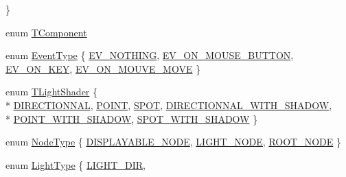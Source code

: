 \begin{DoxyCompactItemize}
 \}
\item 
enum \hyperlink{namespace_agmd_abb9d87ef3f6a4bcb6cc5f2d60ce0bfb3}{T\+Component} 
\item 
enum \hyperlink{namespace_agmd_a1ce5270aaf105962b98398a262590f05}{Event\+Type} \{ \hyperlink{namespace_agmd_a1ce5270aaf105962b98398a262590f05a08636d27d43207cfdbaf9246b26f7c4a}{E\+V\+\_\+\+N\+O\+T\+H\+I\+N\+G}, 
\hyperlink{namespace_agmd_a1ce5270aaf105962b98398a262590f05a6adad47adaf038ae4ff1a31450897cef}{E\+V\+\_\+\+O\+N\+\_\+\+M\+O\+U\+S\+E\+\_\+\+B\+U\+T\+T\+O\+N}, 
\hyperlink{namespace_agmd_a1ce5270aaf105962b98398a262590f05af1c0f29e8647760d770aa1fe8d401140}{E\+V\+\_\+\+O\+N\+\_\+\+K\+E\+Y}, 
\hyperlink{namespace_agmd_a1ce5270aaf105962b98398a262590f05a91c05b6134986db9a10d12e9b065384a}{E\+V\+\_\+\+O\+N\+\_\+\+M\+O\+U\+V\+E\+\_\+\+M\+O\+V\+E}
 \}
\item 
enum \hyperlink{namespace_agmd_aee8ff6eab40434e80559b7a9eeba8dd4}{T\+Light\+Shader} \{ \\*
\hyperlink{namespace_agmd_aee8ff6eab40434e80559b7a9eeba8dd4a15d82839d8fbb16c3a651b9aebee3687}{D\+I\+R\+E\+C\+T\+I\+O\+N\+N\+A\+L}, 
\hyperlink{namespace_agmd_aee8ff6eab40434e80559b7a9eeba8dd4aaf5240300845b9a636c5c59c5cb11133}{P\+O\+I\+N\+T}, 
\hyperlink{namespace_agmd_aee8ff6eab40434e80559b7a9eeba8dd4adc0174908c6b660c935d590f8880d435}{S\+P\+O\+T}, 
\hyperlink{namespace_agmd_aee8ff6eab40434e80559b7a9eeba8dd4af5d83ac033904e96cc0b6dbb0b700e70}{D\+I\+R\+E\+C\+T\+I\+O\+N\+N\+A\+L\+\_\+\+W\+I\+T\+H\+\_\+\+S\+H\+A\+D\+O\+W}, 
\\*
\hyperlink{namespace_agmd_aee8ff6eab40434e80559b7a9eeba8dd4a8960400ae93f99437c6ebd3ec9871109}{P\+O\+I\+N\+T\+\_\+\+W\+I\+T\+H\+\_\+\+S\+H\+A\+D\+O\+W}, 
\hyperlink{namespace_agmd_aee8ff6eab40434e80559b7a9eeba8dd4aa9e794ee7f1be3cb4af9daa6b464e6f2}{S\+P\+O\+T\+\_\+\+W\+I\+T\+H\+\_\+\+S\+H\+A\+D\+O\+W}
 \}
\item 
enum \hyperlink{namespace_agmd_aab017255de32f494c1e7330b4ad7e945}{Node\+Type} \{ \hyperlink{namespace_agmd_aab017255de32f494c1e7330b4ad7e945a7d7b2008d8839de175bb3c3d9407990c}{D\+I\+S\+P\+L\+A\+Y\+A\+B\+L\+E\+\_\+\+N\+O\+D\+E}, 
\hyperlink{namespace_agmd_aab017255de32f494c1e7330b4ad7e945a63c1bc1a788c01f66aa750b33e736612}{L\+I\+G\+H\+T\+\_\+\+N\+O\+D\+E}, 
\hyperlink{namespace_agmd_aab017255de32f494c1e7330b4ad7e945ac7497a77ac2b65e53dd4c93e899cfb79}{R\+O\+O\+T\+\_\+\+N\+O\+D\+E}
 \}
\item 
enum \hyperlink{namespace_agmd_adacbee94d4dc3a4e858b543082fdab10}{Light\+Type} \{ \hyperlink{namespace_agmd_adacbee94d4dc3a4e858b543082fdab10ab26bb0a6b87d23eb0b161797a9db6630}{L\+I\+G\+H\+T\+\_\+\+D\+I\+R}, 

\end{DoxyCompactItemize}
